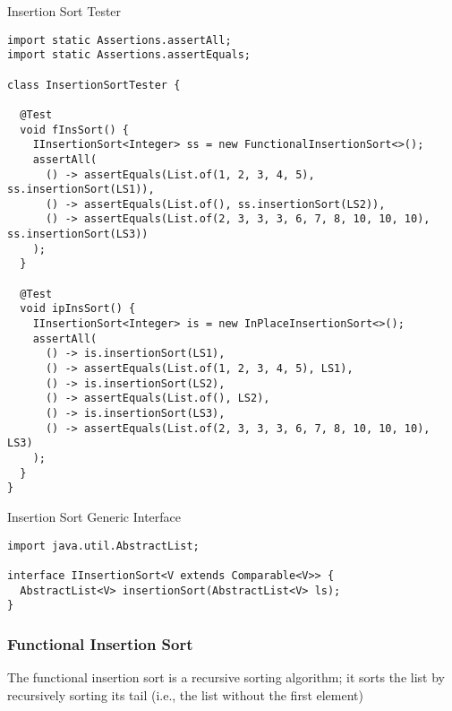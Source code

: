 \begin{cl}{Insertion Sort Tester}
\begin{lstlisting}[language=MyJava]
import static Assertions.assertAll;
import static Assertions.assertEquals;

class InsertionSortTester {

  @Test
  void fInsSort() {
    IInsertionSort<Integer> ss = new FunctionalInsertionSort<>();
    assertAll(
      () -> assertEquals(List.of(1, 2, 3, 4, 5), ss.insertionSort(LS1)),
      () -> assertEquals(List.of(), ss.insertionSort(LS2)),
      () -> assertEquals(List.of(2, 3, 3, 3, 6, 7, 8, 10, 10, 10), ss.insertionSort(LS3))
    );
  }

  @Test
  void ipInsSort() {
    IInsertionSort<Integer> is = new InPlaceInsertionSort<>();
    assertAll(
      () -> is.insertionSort(LS1),
      () -> assertEquals(List.of(1, 2, 3, 4, 5), LS1),
      () -> is.insertionSort(LS2),
      () -> assertEquals(List.of(), LS2),
      () -> is.insertionSort(LS3),
      () -> assertEquals(List.of(2, 3, 3, 3, 6, 7, 8, 10, 10, 10), LS3)
    );
  }
}
\end{lstlisting}
\end{cl}

\begin{cl}{Insertion Sort Generic Interface}
\begin{lstlisting}[language=MyJava]
import java.util.AbstractList;

interface IInsertionSort<V extends Comparable<V>> {
  AbstractList<V> insertionSort(AbstractList<V> ls);
}
\end{lstlisting}
\end{cl}

\subsubsection*{Functional Insertion Sort}

The functional insertion sort is a recursive sorting algorithm; it sorts the list by recursively sorting its tail (i.e., the list without the first element)

